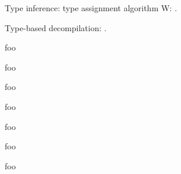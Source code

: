 \documentclass[10pt, a4paper, sigplan, authordraft]{acmart}
\begin{document}
Type inference: type assignment algorithm W: \cite{milner_algorithmw}.

Type-based decompilation: \cite{mycroft_type_based_decompilation}.


foo \cite{reverse_engineering_of_types}

foo \cite{scalable_type_detection}

foo \cite{bintype}

foo \cite{type_inference_on_executables}

foo \cite{dynstruct}

foo \cite{polymorphic_type_inference_for_machine_code}



\clearpage

foo

\clearpage



%
\end{document}
